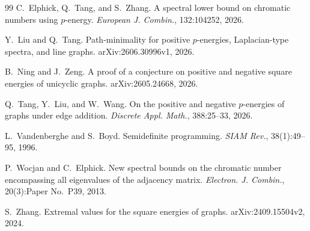 \documentclass[11pt,letterpaper,reqno]{amsart}
\theoremstyle{definition}
\begin{document}
\begin{thebibliography}{99}
C.~Elphick, Q.~Tang, and S.~Zhang.
\newblock A spectral lower bound on chromatic numbers using $p$-energy.
\newblock \emph{European J. Combin.}, 132:104252, 2026.

Y.~Liu and Q.~Tang.
\newblock Path-minimality for positive $p$-energies, Laplacian-type
spectra, and line graphs.
\newblock arXiv:2606.30996v1, 2026.

B.~Ning and J.~Zeng.
\newblock A proof of a conjecture on positive and negative square energies
of unicyclic graphs.
\newblock arXiv:2605.24668, 2026.

Q.~Tang, Y.~Liu, and W.~Wang.
\newblock On the positive and negative $p$-energies of graphs under edge
addition.
\newblock \emph{Discrete Appl. Math.}, 388:25--33, 2026.

L.~Vandenberghe and S.~Boyd.
\newblock Semidefinite programming.
\newblock \emph{SIAM Rev.}, 38(1):49--95, 1996.

P.~Wocjan and C.~Elphick.
\newblock New spectral bounds on the chromatic number encompassing all
eigenvalues of the adjacency matrix.
\newblock \emph{Electron. J. Combin.},
20(3):Paper No.~P39, 2013.

S.~Zhang.
\newblock Extremal values for the square energies of graphs.
\newblock arXiv:2409.15504v2, 2024.

\end{thebibliography}
\end{document}
